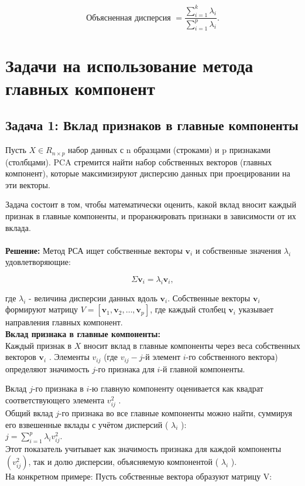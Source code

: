 $$
\text { Объясненная дисперсия }=\frac{\sum_{i=1}^k \lambda_i}{\sum_{i=1}^p \lambda_i} \text {. }
$$

\section{Задачи на использование метода главных компонент}

\subsection{Задача 1: Вклад признаков в главные компоненты}
Пусть $X \in R_{n\times p}$ набор данных с n образцами (строками) и p признаками (столбцами). PCA стремится найти набор собственных векторов (главных компонент), которые максимизируют дисперсию данных при проецировании на эти векторы.

Задача состоит в том, чтобы математически оценить, какой вклад вносит каждый признак в главные компоненты, и проранжировать признаки в зависимости от их вклада.\\ \\
\textbf{Решение:}
Метод РСА ищет собственные векторы $\mathbf{v}_i$ и собственные значения $\lambda_i$ удовлетворяющие:

$$
\Sigma \mathbf{v}_i=\lambda_i \mathbf{v}_i,
$$


где $\lambda_i$ - величина дисперсии данных вдоль $\mathbf{v}_i$.
Собственные векторы $\mathbf{v}_i$ формируют матрицу $V=\left[\mathbf{v}_1, \mathbf{v}_2, \ldots, \mathbf{v}_p\right]$, где каждый столбец $\mathbf{v}_i$ указывает направления главных компонент.\\
\textbf{Вклад признака в главные компоненты:}\\

Каждый признак в $X$ вносит вклад в главные компоненты через веса собственных векторов $\mathbf{v}_i$ . Элементы $v_{i j}$ (где $v_{i j}-j$-й элемент $i$-го собственного вектора) определяют значимость $j$-го признака для $i$-й главной компоненты.

Вклад $j$-го признака в $i$-ю главную компоненту оценивается как квадрат соответствующего элемента $v_{i j}^2$ .\\

Общий вклад $j$-го признака во все главные компоненты можно найти, суммируя его взвешенные вклады с учётом дисперсий ( $\lambda_i$ ):\\
$j=\sum_{i=1}^p \lambda_i v_{i j}^2$.\\
Этот показатель учитывает как значимость признака для каждой компоненты $\left(v_{i j}^2\right)$, так и долю дисперсии, объясняемую компонентой ( $\lambda_i$ ).\\
На конкретном примере:
Пусть собственные вектора образуют матрицу V:

